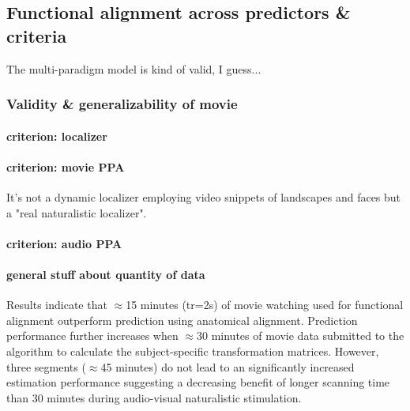 \subsection{Functional alignment across predictors \& criteria}



The multi-paradigm model is kind of valid, I guess...






\subsubsection{Validity \& generalizability of movie}


\paragraph{criterion: localizer}

\paragraph{criterion: movie PPA}

%
It's not a dynamic localizer employing video snippets of landscapes and faces
but a "real naturalistic localizer".

\paragraph{criterion: audio PPA}

\paragraph{general stuff about quantity of data}

%
Results indicate that $\approx$15 minutes (\ac{tr}=2s) of movie watching used
for functional alignment outperform prediction using anatomical alignment.
%
Prediction performance further increases when $\approx$30 minutes of movie data
submitted to the algorithm to calculate the subject-specific transformation
matrices.
%
However, three segments ($\approx$45 minutes) do not lead to an significantly
increased estimation performance suggesting a decreasing benefit of longer
scanning time than 30 minutes during audio-visual naturalistic stimulation.




